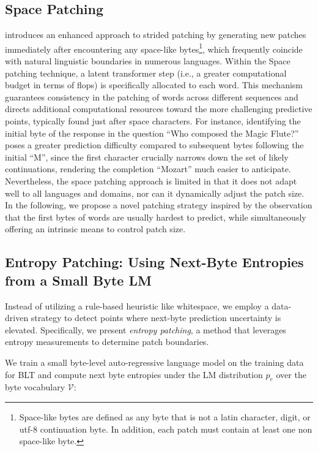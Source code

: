 \subsection{Space Patching}
\label{section:white-patch}

\citet{slagle2024spacebyte} introduces an enhanced approach to strided patching by generating new patches immediately after encountering any space-like bytes\footnote{
    Space-like bytes are defined as any byte that is not a latin character, digit, or utf-8 continuation byte. In addition, each patch must contain at least one non space-like byte. }, which frequently coincide with natural linguistic boundaries in numerous languages. Within the Space patching technique, a latent transformer step (i.e., a greater computational budget in terms of flops) is specifically allocated to each word. This mechanism guarantees consistency in the patching of words across different sequences and directs additional computational resources toward the more challenging predictive points, typically found just after space characters. For instance, identifying the initial byte of the response in the question ``Who composed the Magic Flute?\uline{\hspace{.6em}}'' poses a greater prediction difficulty compared to subsequent bytes following the initial ``M'', since the first character crucially narrows down the set of likely continuations, rendering the completion ``Mozart'' much easier to anticipate. Nevertheless, the space patching approach is limited in that it does not adapt well to all languages and domains, nor can it dynamically adjust the patch size. In the following, we propose a novel patching strategy inspired by the observation that the first bytes of words are usually hardest to predict, while simultaneously offering an intrinsic means to control patch size.

\subsection{Entropy Patching: Using Next-Byte Entropies from a Small Byte LM}
\label{section:dyn-patch}

Instead of utilizing a rule-based heuristic like whitespace, we employ a data-driven strategy to detect points where next-byte prediction uncertainty is elevated. Specifically, we present \textit{entropy patching}, a method that leverages entropy measurements to determine patch boundaries.

We train a small byte-level auto-regressive language model on the training data for {\textsc BLT} and compute next byte entropies under the LM distribution $p_{e}$ over the byte vocabulary $\mathcal{V}$:

